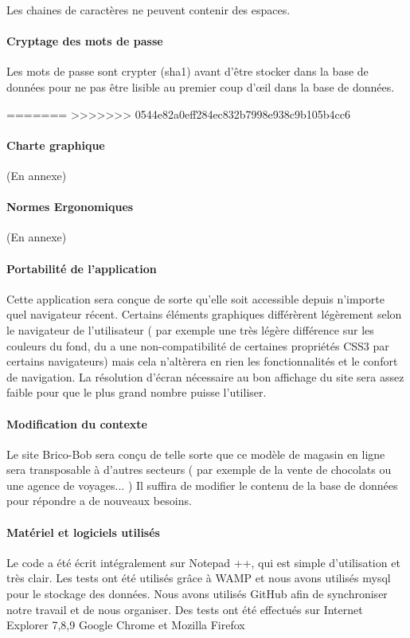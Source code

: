 Les chaines de caractères ne peuvent contenir des espaces.

\paragraph{Cryptage des mots de passe}

Les mots de passe sont crypter (sha1) avant d'être stocker dans la base de données pour ne pas être lisible au premier coup d'œil dans la base de données.

=======
>>>>>>> 0544e82a0eff284ec832b7998e938c9b105b4cc6
\paragraph{Charte graphique}

(En annexe)

\paragraph{Normes Ergonomiques}
	
(En annexe)

\paragraph{Portabilité de l'application}
	
Cette application sera conçue de sorte qu'elle soit accessible depuis n'importe quel navigateur récent. Certains éléments graphiques différèrent légèrement selon le navigateur de l'utilisateur ( par exemple une très légère différence sur les couleurs du fond, du a une non-compatibilité de certaines propriétés CSS3 par certains navigateurs) mais cela n'altèrera en rien les fonctionnalités et le confort de navigation.
La résolution d'écran nécessaire au bon affichage du site sera assez faible pour que le plus grand nombre puisse l'utiliser.

\paragraph{Modification du contexte}
	
Le site Brico-Bob sera conçu de telle sorte que ce modèle de magasin en ligne sera transposable à d'autres secteurs ( par exemple de la vente de chocolats ou  une agence de voyages... ) Il suffira de modifier le contenu de la base de données pour répondre a de nouveaux besoins.

\paragraph{Matériel et logiciels utilisés}
	
Le code a été écrit intégralement sur Notepad ++, qui est simple d'utilisation et très clair.
Les tests ont été utilisés grâce à WAMP et nous avons utilisés mysql pour le stockage des données.
Nous avons utilisés GitHub afin de synchroniser notre travail et de nous organiser.
Des tests ont été effectués sur Internet Explorer 7,8,9 Google Chrome et Mozilla Firefox
